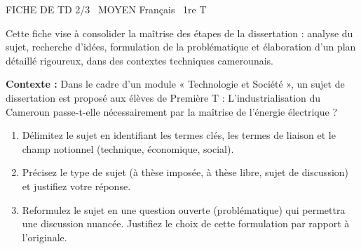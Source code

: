 \documentclass[11pt]{article}
\begin{document}
\begin{tcolorbox}[enhanced,colback=popink,colframe=popink,arc=10pt,boxrule=0pt,left=12pt,right=12pt,top=9pt,bottom=9pt]
{\color{white}\popxbold\small FICHE DE TD 2/3 \textbullet\ MOYEN \hfill Français \textbullet\ 1re T\par}
\end{tcolorbox}
\vspace{4pt}
\noindent Cette fiche vise à consolider la maîtrise des étapes de la dissertation : analyse du sujet, recherche d'idées, formulation de la problématique et élaboration d'un plan détaillé rigoureux, dans des contextes techniques camerounais.

\begin{exercice}
\textbf{Contexte :} Dans le cadre d'un module « Technologie et Société », un sujet de dissertation est proposé aux élèves de Première T : \og L'industrialisation du Cameroun passe-t-elle nécessairement par la maîtrise de l'énergie électrique ? \fg{}

\begin{enumerate}
    \item Délimitez le sujet en identifiant les termes clés, les termes de liaison et le champ notionnel (technique, économique, social).
    \item Précisez le type de sujet (à thèse imposée, à thèse libre, sujet de discussion) et justifiez votre réponse.
    \item Reformulez le sujet en une question ouverte (problématique) qui permettra une discussion nuancée. Justifiez le choix de cette formulation par rapport à l'originale.
\end{enumerate}
\end{exercice}
\end{document}
